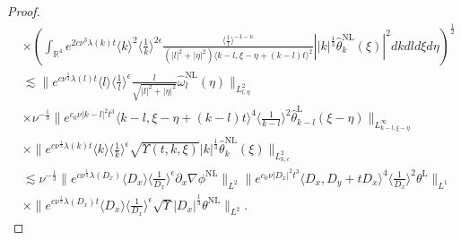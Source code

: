 \documentclass[reqno, 12pt]{amsart} %
\theoremstyle{plain} %
\theoremstyle{definition}
\theoremstyle{remark}
\numberwithin{equation}{section} %
\begin{document}
\begin{proof}
\begin{align*}
			& \times\left(\int_{\mathbb{R}^4} e^{2 c \nu^3 \lambda(k) t}\langle k\rangle^2\langle\frac{1}{k}\rangle^{2 \epsilon} \frac{\langle\frac{1}{l}\rangle^{-1-\kappa}}{\left(|l|^2+|\eta|^2\right)\langle k-l, \xi-\eta+(k-l) t\rangle^2}\left| |k|^\frac13 \hat{\theta}_k^{\mathrm{NL}}(\xi)\right|^2 d k d l d \xi d \eta\right)^{\frac{1}{2}} \\
			& \lesssim\|e^{c \nu^{\frac{1}{3}} \lambda(l) t}\langle l\rangle\langle\frac{1}{l}\rangle^\epsilon \frac{l}{\sqrt{|l|^2+|\eta|^2}} \hat{\omega}_l^{\mathrm{NL}}(\eta)\|_{L_{l, \eta}^2} \\
			& \times \nu^{-\frac{1}{3}}\|e^{c_0 \nu|k-l|^2 t^3}\langle k-l, \xi-\eta+(k-l) t\rangle^4\langle\frac{1}{k-l}\rangle^2  \hat{\theta}_{k-l}^{\mathrm{L}}(\xi-\eta)\|_{L_{k-l, \xi-\eta}^{\infty}} \\
			& \times\|e^{c \nu^{\frac{1}{3}} \lambda(k) t}\langle k\rangle\langle\frac{1}{k}\rangle^\epsilon \sqrt{\Upsilon(t, k, \xi)} |k|^\frac13  \hat{\theta}_k^{\mathrm{NL}}(\xi)\|_{L_{k, \epsilon}^2} \\
			& \lesssim \nu^{-\frac{1}{3}}\|e^{c \nu^{\frac{1}{3}} \lambda\left(D_x\right)}\langle D_x\rangle\langle\frac{1}{D_x}\rangle^\epsilon \partial_x \nabla \phi^{\mathrm{NL}}\|_{L^2}\|e^{c_0 \nu\left|D_x\right|^2 t^3}\langle D_x, D_y+t D_x\rangle^4\langle\frac{1}{D_x}\rangle^2 \theta^{\mathrm{L}}\|_{L^1} \\
			& \times\|e^{c \nu^{\frac{1}{3}} \lambda\left(D_x\right) t}\langle D_x\rangle\langle\frac{1}{D_x}\rangle^\epsilon \sqrt{\Upsilon} |D_x|^\frac13  \theta^{\mathrm{NL}}\|_{L^2} .
		\end{align*}
		

\end{proof}
\end{document}
